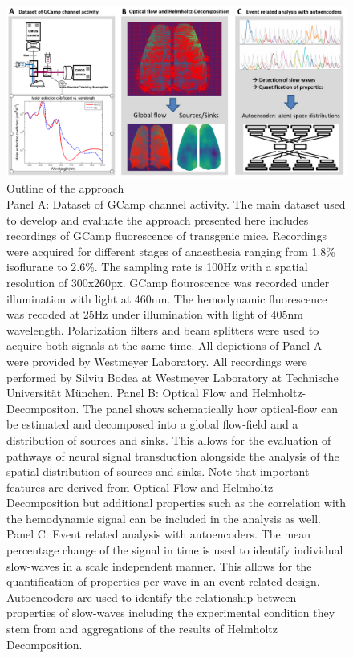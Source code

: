 \begin{figure}[!htb]
\centering
\includegraphics[width=\textwidth,height=\textheight,keepaspectratio]{Figures/outline_approach}
\decoRule
\caption[Outline of the approach]{Outline of the approach\\Panel A: Dataset of GCamp channel activity. The main dataset used to develop and evaluate the approach presented here includes recordings of GCamp fluorescence of transgenic mice. Recordings were acquired for different stages of anaesthesia ranging from 1.8\% isoflurane to 2.6\%. The sampling rate is 100Hz with a spatial resolution of 300x260px. GCamp flouroscence was recorded under illumination with light at 460nm. The hemodynamic fluorescence was recoded at 25Hz under illumination with light of 405nm wavelength. Polarization filters and beam splitters were used to acquire both signals at the same time. All depictions of Panel A were provided by Westmeyer Laboratory. All recordings were performed by Silviu Bodea at Westmeyer Laboratory at Technische Universität München. Panel B: Optical Flow and Helmholtz-Decompositon. The panel shows schematically how optical-flow can be estimated and decomposed into a global flow-field and a distribution of sources and sinks. This allows for the evaluation of pathways of neural signal transduction alongside the analysis of the spatial distribution of sources and sinks. Note that important features are derived from Optical Flow and Helmholtz-Decomposition but additional properties such as the correlation with the hemodynamic signal can be included in the analysis as well. Panel C: Event related analysis with autoencoders. The mean percentage change of the signal in time is used to identify individual slow-waves in a scale independent manner. This allows for the quantification of properties per-wave in an event-related design. Autoencoders are used to identify the relationship between properties of slow-waves including the experimental condition they stem from and aggregations of the results of Helmholtz Decomposition.}
\label{fig:outline_approach}
\end{figure}
